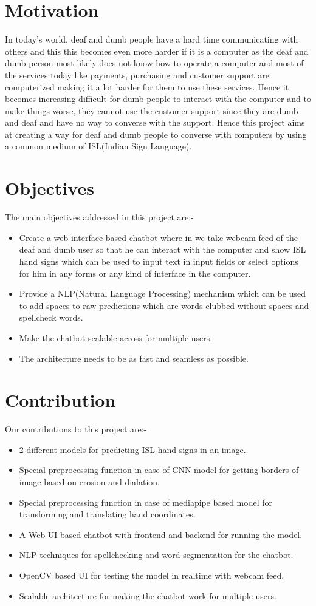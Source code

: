 \documentclass[12pt,a4paper]{report}
\begin{document}
\section{Motivation}
In today's world, deaf and dumb people have a hard time communicating with others and this this becomes even more harder if it is a computer as the deaf and dumb person most likely does not know how to operate a computer and most of the services today like payments, purchasing and customer support are computerized making it a lot harder for them to use these services. Hence it becomes increasing difficult for dumb people to interact with the computer and to make things worse, they cannot use the customer support since they are dumb and deaf and have no way to converse with the support. Hence this project aims at creating a way for deaf and dumb people to converse with computers by using a common medium of ISL(Indian Sign Language).

\section{Objectives}
The main objectives addressed in this project are:-
\begin{itemize}
	\item Create a web interface based chatbot where in we take webcam feed of the deaf and dumb user so that he can interact with the computer and show ISL hand signs which can be used to input text in input fields or select options for him in any forms or any kind of interface in the computer.
	\item Provide a NLP(Natural Language Processing) mechanism which can be used to add spaces to raw predictions which are words clubbed without spaces and spellcheck words.
	\item Make the chatbot scalable across for multiple users.
	\item The architecture needs to be as fast and seamless as possible.
\end{itemize}

\section{Contribution}
Our contributions to this project are:-
\begin{itemize}
	\item 2 different models for predicting ISL hand signs in an image.
	\item Special preprocessing function in case of CNN model for getting borders of image based on erosion and dialation.
	\item Special preprocessing function in case of mediapipe based model for transforming and translating hand coordinates.
	\item A Web UI based chatbot with frontend and backend for running the model.
	\item NLP techniques for spellchecking and word segmentation for the chatbot.
	\item OpenCV based UI for testing the model in realtime with webcam feed.
	\item Scalable architecture for making the chatbot work for multiple users.
\end{itemize}
\end{document}
